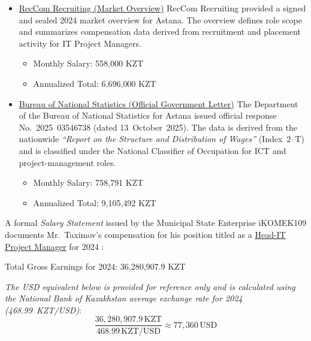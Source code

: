 \begin{itemize}
\medskip

\item \underline{RecCom Recruiting (Market Overview)}
RecCom Recruiting provided a signed and sealed 2024 market overview for Astana. The overview defines role scope and summarizes compensation data derived from recruitment and placement activity for IT Project Managers.

\vspace{-0.5\baselineskip}
\begin{itemize}[nosep]
    \item Monthly Salary: 558{,}000 KZT
    \item Annualized Total: 6{,}696{,}000 KZT 
\end{itemize}



\medskip

\item \underline{Bureau of National Statistics (Official Government Letter)}
The Department of the Bureau of National Statistics for Astana issued official response No.~2025~03546738 (dated 13~October~2025). The data is derived from the nationwide \emph{``Report on the Structure and Distribution of Wages''} (Index~2--T) and is classified under the National Classifier of Occupation for ICT and project-management roles.

\vspace{-0.5\baselineskip}
\begin{itemize}[nosep]
    \item Monthly Salary: 758{,}791 KZT
    \item Annualized Total: 9{,}105{,}492 KZT 
\end{itemize}

\end{itemize}


\medskip

A formal \emph{Salary Statement} issued by the Municipal State Enterprise iKOMEK109 documents Mr.~Taximov’s compensation for his position titled as a \underline{Head-IT Project Manager} for 2024 :

\begin{center}Total Gross Earnings for 2024: 36{,}280{,}907.9 KZT\end{center}

\textit{The USD equivalent below is provided for reference only and is calculated using the National Bank of Kazakhstan average exchange rate for 2024 (468.99~KZT/USD)}:
\[
\frac{36{,}280{,}907.9\,\mathrm{KZT}}{468.99\,\mathrm{KZT/USD}} \approx 77{,}360\,\mathrm{USD}
\]


